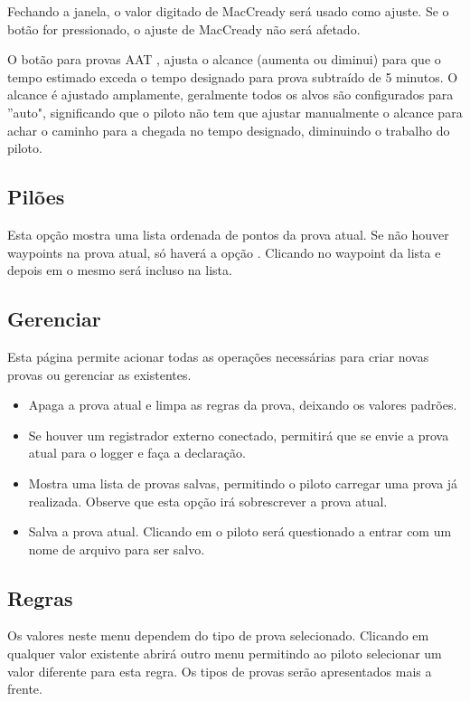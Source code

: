 Fechando a janela, o valor digitado de MacCready será usado como ajuste. Se o botão  for pressionado, o ajuste de MacCready não será afetado.

O botão  para provas AAT , ajusta o alcance (aumenta ou diminui) para que o tempo estimado exceda o tempo designado para prova subtraído de 5 minutos. O alcance é ajustado amplamente, geralmente todos os alvos são configurados para ''auto", significando que o piloto não tem que ajustar manualmente o alcance para achar o caminho para a chegada no tempo designado, diminuindo o trabalho do piloto.
  
\subsection*{Pilões}
Esta opção mostra uma lista ordenada de pontos da prova atual.
Se não houver waypoints na prova atual, só haverá a opção .  Clicando no waypoint da lista e depois em  o mesmo será incluso na lista.  

\subsection*{Gerenciar}
Esta página permite acionar todas as operações necessárias para criar novas provas ou gerenciar
as existentes.


\begin{itemize}
\item [\bmenuw{Nova Prova}] Apaga a prova atual e limpa as regras da prova, deixando os valores padrões.
\item [\bmenuw{Declarar}] Se houver um registrador externo conectado, permitirá que se envie a prova atual para o logger e faça a declaração.
\item [\bmenuw{Procurar}] Mostra uma lista de provas salvas, permitindo o piloto carregar uma prova já realizada.  Observe que esta opção irá sobrescrever a prova atual.
\item [\bmenuw{Salvar}] Salva a prova atual.  Clicando em 
   o piloto será questionado a entrar com um nome de arquivo para ser salvo.
\end{itemize}

\subsection*{Regras}
Os valores neste menu dependem do tipo de prova selecionado.  Clicando 
 em qualquer valor existente abrirá outro menu permitindo ao piloto selecionar um valor diferente para esta regra.  Os tipos de provas serão apresentados mais a frente.

